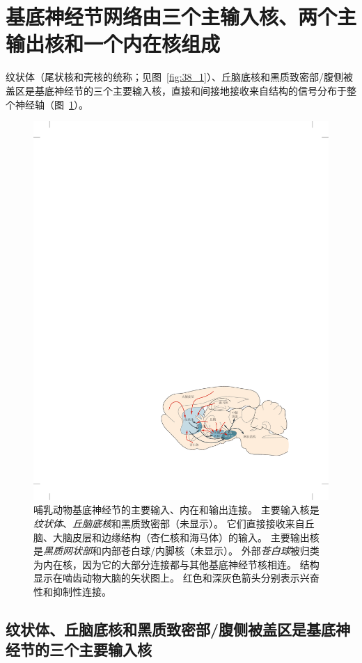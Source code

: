 \section{基底神经节网络由三个主输入核、两个主输出核和一个内在核组成}

纹状体（尾状核和壳核的统称；见图~\ref{fig:38_1}）、丘脑底核和黑质致密部/腹侧被盖区是基底神经节的三个主要输入核，直接和间接地接收来自结构的信号分布于整个神经轴（图~\ref{fig:38_2}）。


\begin{figure}[htbp]
	\centering
	\includegraphics[width=0.77\linewidth]{chap38/fig_38_2}
	\caption{哺乳动物基底神经节的主要输入、内在和输出连接。
		主要输入核是\textit{纹状体}、\textit{丘脑底核}和黑质致密部（未显示）。
		它们直接接收来自丘脑、大脑皮层和边缘结构（杏仁核和海马体）的输入。
		主要输出核是\textit{黑质网状部}和内部苍白球/内脚核（未显示）。
		外部\textit{苍白球}被归类为内在核，因为它的大部分连接都与其他基底神经节核相连。
		结构显示在啮齿动物大脑的矢状图上。
		红色和深灰色箭头分别表示兴奋性和抑制性连接。}
	\label{fig:38_2}
\end{figure}



\subsection{纹状体、丘脑底核和黑质致密部/腹侧被盖区是基底神经节的三个主要输入核}

